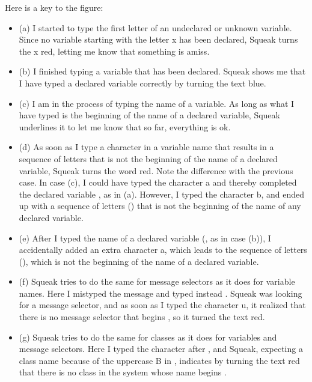 \documentclass[a4paper,10pt,twoside]{book}
\begin{document}
Here is a key to the figure: 
\begin{itemize}
\item (a) I started to type the first letter of an undeclared or unknown variable. Since no variable 
starting with the letter x has been declared, Squeak turns the x red, letting me know 
that something is amiss. 

\item (b) I finished typing a variable that has been declared. Squeak shows me that I have typed 
a declared variable correctly by turning the text blue. 

\item (c) I am in the process of typing the name of a variable. As long as what I have typed is the 
beginning of the name of a declared variable, Squeak underlines it to let me know that 
so far, everything is ok. 

\item (d) As soon as I type a character in a variable name that results in a sequence of letters 
that is not the beginning of the name of a declared variable, Squeak turns the word 
red. Note the difference with the previous case. In case (c), I could have typed the character a and thereby completed the declared variable , as in (a). However, I typed 
the character b, and ended up with a sequence of letters () that is not the beginning of the name of any declared variable. 

\item (e) After I typed the name of a declared variable (, as in case (b)), I accidentally added 
an extra character a, which leads to the sequence of letters (), which is not the 
beginning of the name of a declared variable. 

\item (f) Squeak tries to do the same for message selectors as it does for variable names. Here I 
mistyped the message  and typed instead . Squeak was looking for a message 
selector, and as soon as I typed the character u, it realized that there is no message 
selector that begins , so it turned the text red. 

\item (g) Squeak tries to do the same for classes as it does for variables and message selectors. 
Here I typed the character  after , and Squeak, expecting a class name because of 
the uppercase B in , indicates by turning the text red that there is no class in the 
system whose name begins . 
\end{itemize}
\end{document}

